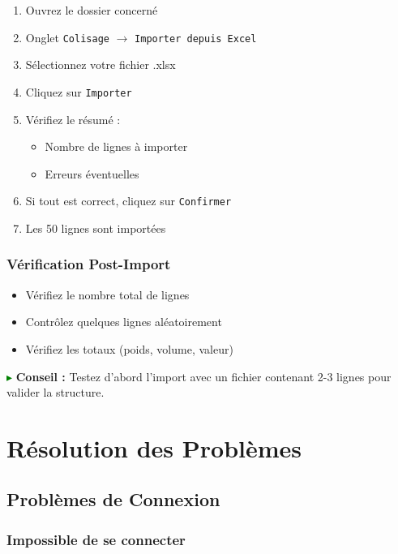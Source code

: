 \documentclass[12pt,a4paper]{report}
\begin{document}
\begin{enumerate}[leftmargin=*]
    \item Ouvrez le dossier concerné
    \item Onglet \texttt{Colisage} $\rightarrow$ \texttt{Importer depuis Excel}
    \item Sélectionnez votre fichier .xlsx
    \item Cliquez sur \texttt{Importer}
    \item Vérifiez le résumé :
    \begin{itemize}
        \item Nombre de lignes à importer
        \item Erreurs éventuelles
    \end{itemize}
    \item Si tout est correct, cliquez sur \texttt{Confirmer}
    \item Les 50 lignes sont importées
\end{enumerate}

\subsection{Vérification Post-Import}

\begin{itemize}[leftmargin=*]
    \item Vérifiez le nombre total de lignes
    \item Contrôlez quelques lignes aléatoirement
    \item Vérifiez les totaux (poids, volume, valeur)
\end{itemize}

\textcolor{green}{$\blacktriangleright$} \textbf{Conseil :} Testez d'abord l'import avec un fichier contenant 2-3 lignes pour valider la structure.

\chapter{Résolution des Problèmes}

\section{Problèmes de Connexion}

\subsection{Impossible de se connecter}
\end{document}
